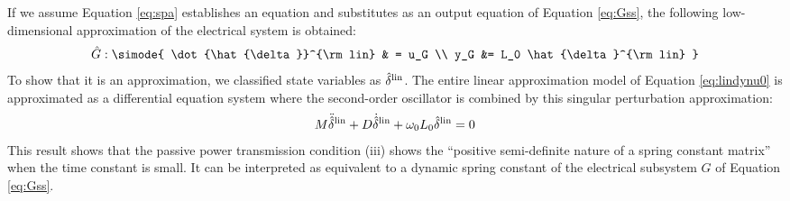 \documentclass[tombow,dvipdfmx]{corona-a5-1.1}
\begin{document}
If we assume Equation \ref{eq:spa} establishes an equation and substitutes as an output equation of Equation \ref{eq:Gss}, the following low-dimensional approximation of the electrical system is obtained:
\begin{align}\label{eq:Gsssp}
\hat{G}: \simode{
\dot{\hat{\delta}}^{\rm lin} & = u_G \\
y_G &= L_0 \hat{\delta}^{\rm lin}
}
\end{align}
To show that it is an approximation, we classified state variables as $\hat{\delta}^{\rm lin}$.
The entire linear approximation model of Equation \ref{eq:lindynu0} is approximated as a differential equation system where the second-order oscillator is combined by this singular perturbation approximation:
\begin{align}\label{eq:spamodel}
M \ddot{\hat{\delta}}^{\rm lin}
+ D \dot{\hat{\delta}}^{\rm lin}
+\omega_0 L_0 \hat{\delta}^{\rm lin}=0
\end{align}
This result shows that the passive power transmission condition (iii) shows the “positive semi-definite nature of a spring constant matrix” when the time constant is small.
It can be interpreted as equivalent to a dynamic spring constant of the electrical subsystem $G$ of Equation \ref{eq:Gss}.
\end{document}
